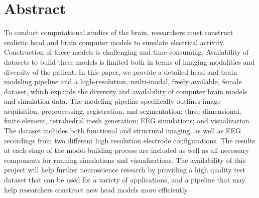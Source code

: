 %

\section*{Abstract}

To conduct computational studies of the brain, researchers must construct realistic head and brain computer models to simulate electrical activity. Construction of these models is challenging and time consuming. Availability of datasets to build these models is limited both in terms of imaging modalities and diversity of the patient. In this paper, we provide a detailed head and brain modeling pipeline and a high-resolution, multi-modal, freely available, female dataset, which expands the diversity and availability of computer brain models and simulation data. The modeling pipeline specifically outlines image acquisition, preprocessing, registration, and segmentation; three-dimensional, finite element, tetrahedral mesh generation; EEG simulations; and visualization. The dataset includes both functional and structural imaging, as well as EEG recordings from two different high resolution electrode configurations. The results at each stage of the model-building process are included as well as all necessary components for running simulations and visualizations. The availability of this project will help further neuroscience research by providing a high quality test dataset that can be used for a variety of applications, and a pipeline that may help researchers construct new head models more efficiently.